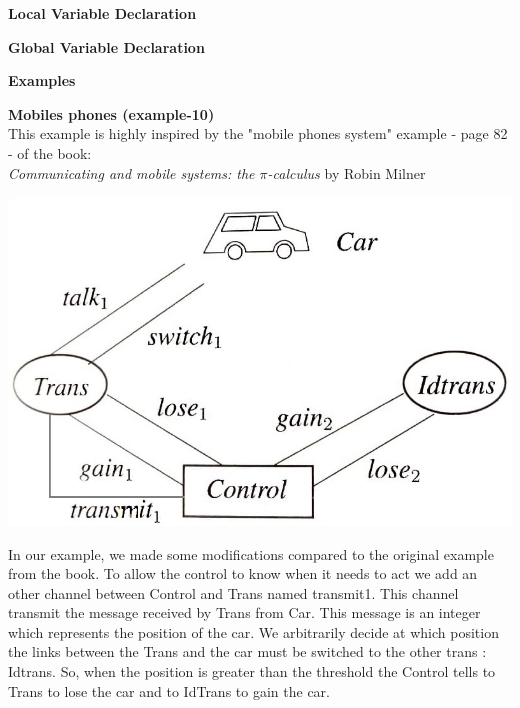 \documentclass[11pt]{report}
\begin{document}
\tabto{0cm} {\large \textbf{Local Variable Declaration}}
\begin{prooftree}
\end{prooftree}

\tabto{0cm} {\large \textbf{Global Variable Declaration}}
\begin{prooftree}
\end{prooftree}

\newpage
\centerline{\textbf{\Huge Examples}}
\vspace*{3pt}
\vspace*{20pt}
\tabto{0cm} {\Large \textbf{Mobiles phones (example-10)}}
\vspace*{3pt}
\\
This example is highly inspired by the "mobile phones system" example - page 82 - of the book: \\
\textit{Communicating and mobile systems: the $\pi$-calculus} by Robin Milner 

\begin{center}
\includegraphics[scale = 0.5]{mobile-phone-system.jpg}
\end{center}
In our example, we made some modifications compared to the original example from the book. To allow the control to know when it needs to act we add an other channel between Control and Trans named transmit1. This channel transmit the message received by Trans from Car. This message is an integer which represents the position of the car. We arbitrarily decide at which position the links between the Trans and the car must be switched to the other trans : Idtrans. So, when the position is greater than the threshold the Control tells to Trans to lose the car and to IdTrans to gain the car.
\end{document}
